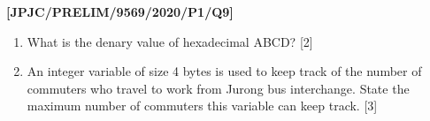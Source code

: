 \item \textbf{{[}JPJC/PRELIM/9569/2020/P1/Q9{]} }
\begin{enumerate}
\item What is the denary value of hexadecimal ABCD? \hfill{} {[}2{]}
\item An integer variable of size 4 bytes is used to keep track of the number
of commuters who travel to work from Jurong bus interchange. State
the maximum number of commuters this variable can keep track. \hfill{}{[}3{]}
\end{enumerate}